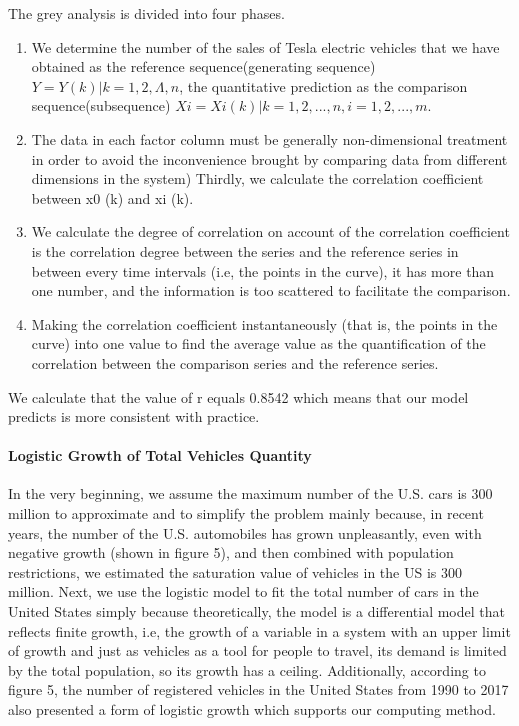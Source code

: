 \documentclass{mcmthesis}
\begin{document}
				 The grey analysis is divided into four phases. 
				 \begin{enumerate}[1.]
				 	\item We determine the number of the sales of Tesla electric vehicles that we have obtained as the reference sequence(generating sequence) $Y={Y(k) | k = 1,2,Λ,n}$,  the quantitative prediction as the comparison sequence(subsequence) $Xi={Xi(k) | k = 1,2,...,n},i = 1,2,...,m$. 
				 	\item The data in each factor column must be generally non-dimensional treatment in order to avoid the inconvenience brought by comparing data from different dimensions in the system) Thirdly, we calculate the correlation coefficient between x0 (k) and xi (k).
				 	\item We calculate the degree of correlation on account of the correlation coefficient is the correlation degree between the series and the reference series in between every time intervals (i.e, the points in the curve), it has more than one number, and the information is too scattered to facilitate the comparison.
				 	\item Making the correlation coefficient instantaneously (that is, the points in the curve) into one value to find the average value as the quantification of the correlation between the comparison series and the reference series. 
				 \end{enumerate}
			 We calculate that the value of r equals 0.8542 which means that our model predicts  is more consistent with practice.

		\paragraph{Logistic Growth  of Total Vehicles  Quantity}
		In the very beginning, we assume the maximum number of the U.S. cars is 300 million to approximate and to simplify the problem mainly because, in recent years, the number of the U.S. automobiles has grown unpleasantly, even with negative growth (shown in figure 5), and then combined with population restrictions, we estimated the saturation value of vehicles in the US is 300 million. Next, we use the logistic model to fit the total number of cars in the United States simply because theoretically, the model is a differential model that reflects finite growth, i.e, the growth of a variable in a system with an upper limit of growth and just as vehicles as a tool for people to travel, its demand is limited by the total population, so its growth has a ceiling. Additionally, according to figure 5, the number of registered vehicles in the United States from 1990 to 2017 also presented a form of logistic growth which supports our computing method.
\end{document}
